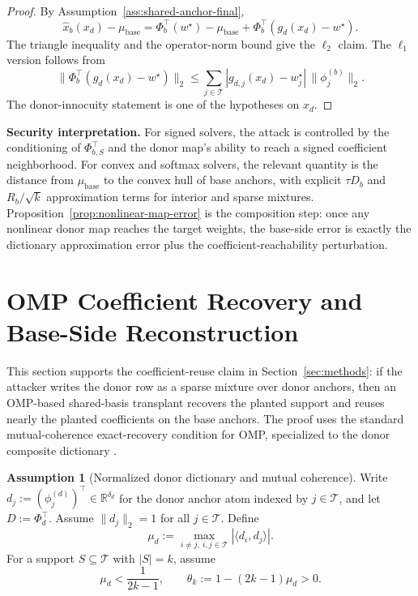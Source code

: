 \documentclass{article}
\theoremstyle{plain}
\theoremstyle{definition}
\newtheorem{assumption}[theorem]{Assumption}
\theoremstyle{remark}
\begin{document}
\begin{proof}
By Assumption~\ref{ass:shared-anchor-final},
\[
\widehat{x}_b(x_d)-\mu_{\mathrm{base}}
=
\Phi_b^\top(w^\star)-\mu_{\mathrm{base}}
+
\Phi_b^\top(g_d(x_d)-w^\star).
\]
The triangle inequality and the operator-norm bound give the $\ell_2$ claim. The $\ell_1$ version follows from
\[
\|\Phi_b^\top(g_d(x_d)-w^\star)\|_2
\le
\sum_{j\in\mathcal{T}}|g_{d,j}(x_d)-w_j^\star|\,\|\phi_j^{(b)}\|_2.
\]
The donor-innocuity statement is one of the hypotheses on $x_d$.
\end{proof}

\noindent\textbf{Security interpretation.}
For signed solvers, the attack is controlled by the conditioning of $\Phi_{b,S}^\top$ and the donor map's ability to reach a signed coefficient neighborhood. For convex and softmax solvers, the relevant quantity is the distance from $\mu_{\mathrm{base}}$ to the convex hull of base anchors, with explicit $\tau D_b$ and $R_b/\sqrt{k}$ approximation terms for interior and sparse mixtures. Proposition~\ref{prop:nonlinear-map-error} is the composition step: once any nonlinear donor map reaches the target weights, the base-side error is exactly the dictionary approximation error plus the coefficient-reachability perturbation.



\section{OMP Coefficient Recovery and Base-Side Reconstruction}
\label{app:omp-coefficient-recovery}

This section supports the coefficient-reuse claim in Section~\ref{sec:methods}: if the attacker writes the donor row as a sparse mixture over donor anchors, then an OMP-based shared-basis transplant recovers the planted support and reuses nearly the planted coefficients on the base anchors. The proof uses the standard mutual-coherence exact-recovery condition for OMP, specialized to the donor composite dictionary \citep{tropp2004greed,troppgilbert2007omp,donohoeladtemlyakov2006stable,caiwang2011omp}.

\begin{assumption}[Normalized donor dictionary and mutual coherence]
\label{ass:omp-coherence}
Write $d_j := (\phi_j^{(d)})^\top \in \mathbb{R}^{\delta_d}$ for the donor anchor atom indexed by $j \in \mathcal{T}$, and let $D := \Phi_d^\top$. Assume $\|d_j\|_2=1$ for all $j\in\mathcal{T}$. Define
\[
\mu_d := \max_{i\neq j,\ i,j\in\mathcal{T}} |\langle d_i,d_j\rangle|.
\]
For a support $S\subseteq\mathcal{T}$ with $|S|=k$, assume
\[
\mu_d < \frac{1}{2k-1},
\qquad
\theta_k := 1-(2k-1)\mu_d > 0.
\]
\end{assumption}
\end{document}
